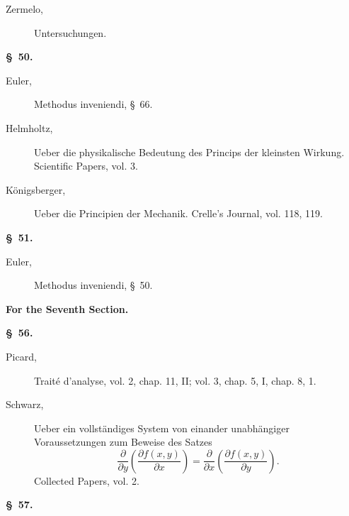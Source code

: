 \documentclass[11pt,a4paper,leqno]{article}
\begin{document}
\begin{description}
\item[Zermelo,] Untersuchungen.
\end{description}

\begin{center}{\bfseries \S~50.}\end{center}

\begin{description}
\item[Euler,] Methodus inveniendi, \S~66.

\item[Helmholtz,] Ueber die physikalische Bedeutung des Princips der kleinsten
Wirkung. Scientific Papers, vol. 3.

\item[Königsberger,] Ueber die Principien der Mechanik. Crelle's Journal,
vol. 118, 119.
\end{description}

\begin{center}{\bfseries \S~51.}\end{center}

\begin{description}
\item[Euler,] Methodus inveniendi, \S~50.
\end{description}

\begin{center}
{\large\bfseries For the Seventh Section.}

{\bfseries \S~56.}
\end{center}

\begin{description}
\item[Picard,] Traité d'analyse, vol. 2, chap. 11, II; vol. 3, chap. 5, I,
chap. 8, 1.

\item[Schwarz,] Ueber ein vollständiges System von einander unabhängiger
Voraussetzungen zum Beweise des Satzes
\[
\frac{\partial}{\partial y}\left(\frac{\partial f(x,y)}{\partial x}\right)
=\frac{\partial}{\partial x}\left(\frac{\partial f(x,y)}{\partial y}\right).
\]
Collected Papers, vol. 2.
\end{description}

\begin{center}{\bfseries \S~57.}\end{center}
\end{document}
